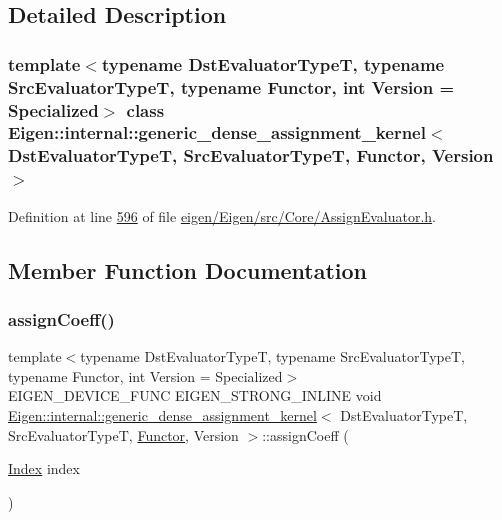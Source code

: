 \subsection{Detailed Description}
\subsubsection*{template$<$typename Dst\+Evaluator\+TypeT, typename Src\+Evaluator\+TypeT, typename Functor, int Version = Specialized$>$\newline
class Eigen\+::internal\+::generic\+\_\+dense\+\_\+assignment\+\_\+kernel$<$ Dst\+Evaluator\+Type\+T, Src\+Evaluator\+Type\+T, Functor, Version $>$}



Definition at line \hyperlink{eigen_2_eigen_2src_2_core_2_assign_evaluator_8h_source_l00596}{596} of file \hyperlink{eigen_2_eigen_2src_2_core_2_assign_evaluator_8h_source}{eigen/\+Eigen/src/\+Core/\+Assign\+Evaluator.\+h}.



\subsection{Member Function Documentation}
\mbox{\label{class_eigen_1_1internal_1_1generic__dense__assignment__kernel_a9f36120222600d1d843b4253b08a383b}} 
\subsubsection{\texorpdfstring{assign\+Coeff()}{assignCoeff()}\hspace{0.1cm}{\footnotesize\ttfamily [1/2]}}
{\footnotesize\ttfamily template$<$typename Dst\+Evaluator\+TypeT, typename Src\+Evaluator\+TypeT, typename Functor, int Version = Specialized$>$ \\
E\+I\+G\+E\+N\+\_\+\+D\+E\+V\+I\+C\+E\+\_\+\+F\+U\+NC E\+I\+G\+E\+N\+\_\+\+S\+T\+R\+O\+N\+G\+\_\+\+I\+N\+L\+I\+NE void \hyperlink{class_eigen_1_1internal_1_1generic__dense__assignment__kernel}{Eigen\+::internal\+::generic\+\_\+dense\+\_\+assignment\+\_\+kernel}$<$ Dst\+Evaluator\+TypeT, Src\+Evaluator\+TypeT, \hyperlink{struct_functor}{Functor}, Version $>$\+::assign\+Coeff (\begin{DoxyParamCaption}\item[{\hyperlink{namespace_eigen_a62e77e0933482dafde8fe197d9a2cfde}{Index}}]{index }\end{DoxyParamCaption})\hspace{0.3cm}{\ttfamily [inline]}}

